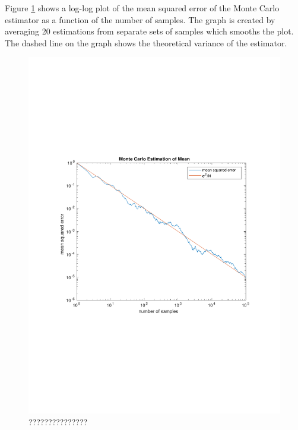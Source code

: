 \documentclass[12pt]{article}
\begin{document}
Figure \ref{fig:mote-mean} shows a log-log plot of the mean squared error of the Monte Carlo estimator as a function of the number of samples.
The graph is created by averaging 20 estimations from separate sets of samples which smooths the plot.
The dashed line on the graph shows the theoretical variance of the estimator.

\begin{figure}[!htb]
\includegraphics[width=\paperwidth]{figures/mote-carlo-mean-estimator.pdf}
  \caption{???????????????}
  \label{fig:mote-mean}
\end{figure}
\end{document}
